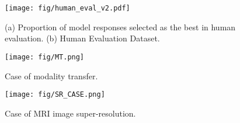 

\begin{figure}[h]
    \centering
    \texttt{[image: fig/human\_eval\_v2.pdf]}
    \caption{(a) Proportion of model responses selected as the best in human evaluation. (b) Human Evaluation Dataset.}
    \label{fig:human_eval}
    \vskip -0.1in
\end{figure}
\begin{figure}[h]
    \centering
    \texttt{[image: fig/MT.png]}
    \caption{Case of modality transfer.}
    \label{fig:mt_case}
    \vskip -0.1in
\end{figure}
\begin{figure}[h]
    \centering
    \texttt{[image: fig/SR\_CASE.png]}
    \caption{Case of MRI image super-resolution.}
    \label{fig:sr_case}
    \vskip -0.1in
\end{figure}






